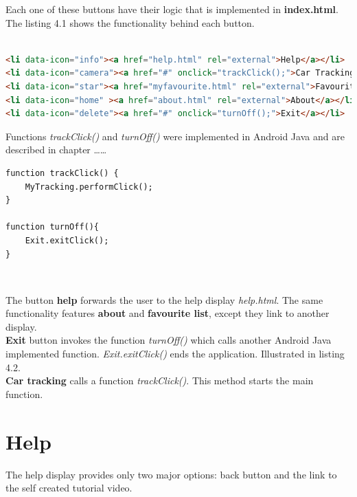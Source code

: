 Each one of these buttons have their logic that is implemented in \textbf{index.html}. The listing 4.1 shows the functionality behind each button.
\\
\
\
\begin{lstlisting}[language=html, caption= 
start menu source code,captionpos=b]
<li data-icon="info"><a href="help.html" rel="external">Help</a></li>
<li data-icon="camera"><a href="#" onclick="trackClick();">Car Tracking</a></li>
<li data-icon="star"><a href="myfavourite.html" rel="external">Favourite List</a></li>
<li data-icon="home" ><a href="about.html" rel="external">About</a></li>
<li data-icon="delete"><a href="#" onclick="turnOff();">Exit</a></li>
\end{lstlisting}





Functions \textit{trackClick()} and \textit{turnOff()} were implemented in Android Java and are described in chapter ……
\\


\begin{lstlisting}[language=html, caption= 
JavaScript functions,captionpos=b]
function trackClick() {
    MyTracking.performClick();
}

function turnOff(){
	Exit.exitClick();
}
\end{lstlisting}
\


The button \textbf{help} forwards the user to the help display \textit{help.html}. The same functionality features \textbf{about} and \textbf{favourite list}, except they link to another display. 
\\

\textbf{Exit} button invokes the function \textit{turnOff()} which calls another Android Java implemented function. \textit{Exit.exitClick()} ends the application. Illustrated in listing 4.2.
\\

\textbf{Car tracking} calls a function \textit{trackClick()}. This method starts the main function.
\\

\section{Help}

The help display provides only two major options: back button and the link to the self created tutorial video. 


